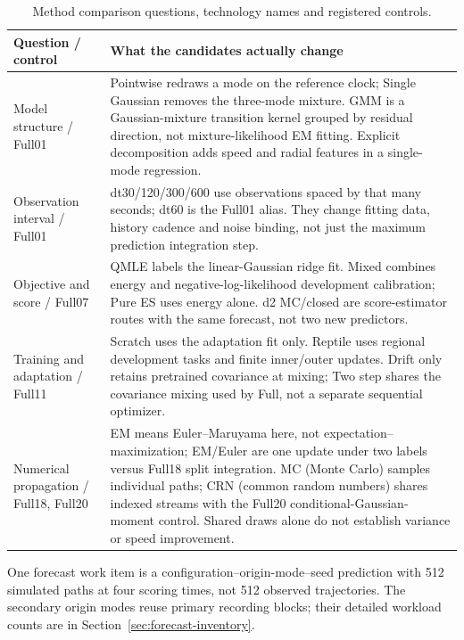 \begingroup
\renewcommand{\topfraction}{.95}
\renewcommand{\textfraction}{.02}
\begin{table}[htbp]
\centering\footnotesize
\caption{Method comparison questions, technology names and registered controls.}
\label{tab:method-reader}\hypertarget{tab:method-reader}{}
\begin{tabular}{@{}p{.22\linewidth}p{.69\linewidth}@{}}
\toprule
Question / control & What the candidates actually change\\
\midrule
Model structure / Full01 &
Pointwise redraws a mode on the reference clock; Single Gaussian removes the
three-mode mixture. GMM is a Gaussian-mixture transition kernel grouped by
residual direction, not mixture-likelihood EM fitting. Explicit decomposition
adds speed and radial features in a single-mode regression.\\
Observation interval / Full01 &
dt30/120/300/600 use observations spaced by that many seconds; dt60 is the
Full01 alias. They change fitting data, history cadence and noise binding,
not just the maximum prediction integration step.\\
Objective and score / Full07 &
QMLE labels the linear-Gaussian ridge fit. Mixed combines energy and
negative-log-likelihood development calibration; Pure ES uses energy alone.
d2 MC/closed are score-estimator routes with the same forecast, not two new
predictors.\\
Training and adaptation / Full11 &
Scratch uses the adaptation fit only. Reptile uses regional development
tasks and finite inner/outer updates. Drift only retains pretrained
covariance at mixing; Two step shares the covariance mixing used by Full,
not a separate sequential optimizer.\\
Numerical propagation / Full18, Full20 &
EM means Euler--Maruyama here, not expectation--maximization; EM/Euler are
one update under two labels versus Full18 split integration. MC (Monte Carlo)
samples individual paths; CRN (common random numbers) shares indexed streams
with the Full20 conditional-Gaussian-moment control. Shared draws alone do
not establish variance or speed improvement.\\
\bottomrule
\end{tabular}
\end{table}

One forecast work item is a configuration--origin-mode--seed prediction
with 512 simulated paths at four scoring times, not 512 observed trajectories.
The secondary origin modes reuse primary recording blocks; their detailed
workload counts are in Section~\ref{sec:forecast-inventory}.

